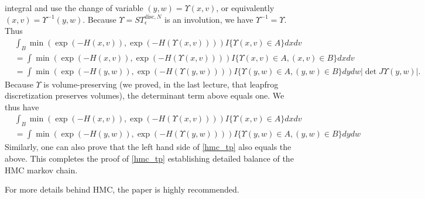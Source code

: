\documentclass{scrartcl}
\begin{document}
integral and use the change of variable $(y, w) = \Upsilon(x, v)$, or
equivalently $(x, v) = \Upsilon^{-1}(y, w)$. Because $\Upsilon =
ST_{\epsilon}^{\text{disc}, N}$ is an involution, we have
$\Upsilon^{-1} = \Upsilon$. Thus
\begin{align*}
&  \int_B \min \left(\exp(-H(x, v)), \exp(-H(\Upsilon(x, v)))
  \right) I\{\Upsilon(x, v) \in A\} dx dv \\
&= \int \min \left(\exp(-H(x, v)), \exp(-H(\Upsilon(x, v)))
  \right) I\{\Upsilon(x, v) \in A, (x, v) \in B\} dx dv \\
&= \int \min \left(\exp(-H(y, w)), \exp(-H(\Upsilon(y, w)))
  \right) I\{\Upsilon(y, w) \in A, (y, w) \in B\} dy dw |\det J
  \Upsilon(y, w)|. 
\end{align*}
Because $\Upsilon$ is volume-preserving (we proved, in the last
lecture, that leapfrog discretization preserves volumes), the
determinant term above equals one. We thus have
\begin{align*}
&  \int_B \min \left(\exp(-H(x, v)), \exp(-H(\Upsilon(x, v)))
  \right) I\{\Upsilon(x, v) \in A\} dx dv \\
&= \int \min \left(\exp(-H(y, w)), \exp(-H(\Upsilon(y, w)))
  \right) I\{\Upsilon(y, w) \in A, (y, w) \in B\} dy dw  
\end{align*}
Similarly, one can also prove that the left hand side of
\eqref{hmc_tp} also equals the above. This completes the proof of
\eqref{hmc_tp} establishing detailed balance of the HMC markov chain.

For more details behind HMC, the paper \citet{neal2011mcmc} is highly
recommended. 
\end{document}
